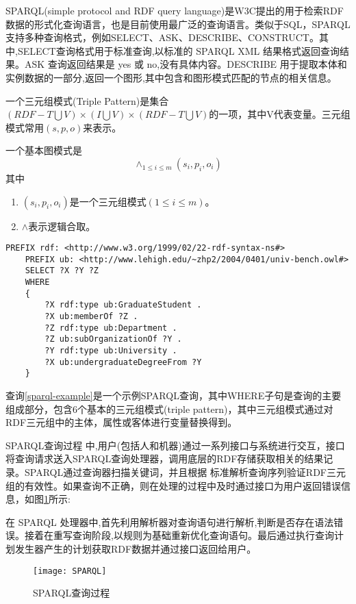 SPARQL(simple protocol and RDF query language)是W3C提出的用于检索RDF数据的形式化查询语言，也是目前使用最广泛的查询语言。类似于SQL，SPARQL支持多种查询格式，例如SELECT、ASK、DESCRIBE、CONSTRUCT。其中,SELECT查询格式用于标准查询,以标准的 SPARQL XML 结果格式返回查询结果。ASK 查询返回结果是 yes 或 no,没有具体内容。DESCRIBE 用于提取本体和实例数据的一部分,返回一个图形,其中包含和图形模式匹配的节点的相关信息。
\begin{definition}[（三元组模式）] 
    \label{Triple}   
    一个三元组模式(Triple Pattern)是集合$(RDF-T \bigcup V)\times(I \bigcup V)\times(RDF-T \bigcup V)$的一项，其中V代表变量。三元组模式常用$(s,p,o)$来表示。
\end{definition}
\begin{definition}    
    \label{BGP}
    一个基本图模式是$$\wedge_{1\leqslant i\leqslant m}(s_i,p_i,o_i)$$
    其中
    \begin{enumerate}
        \item $(s_i,p_i,o_i)$是一个三元组模式$(1 \leqslant  i \leqslant m)$。
        \item $\wedge$表示逻辑合取。
    \end{enumerate}
    
\end{definition}

\begin{lstlisting}[caption={SPARQL查询语句},label={sparql-example}]
    PREFIX rdf: <http://www.w3.org/1999/02/22-rdf-syntax-ns#>
    PREFIX ub: <http://www.lehigh.edu/~zhp2/2004/0401/univ-bench.owl#>
    SELECT ?X ?Y ?Z
    WHERE
    {
        ?X rdf:type ub:GraduateStudent .  
        ?X ub:memberOf ?Z .               
        ?Z rdf:type ub:Department .       
        ?Z ub:subOrganizationOf ?Y .      
        ?Y rdf:type ub:University .       
        ?X ub:undergraduateDegreeFrom ?Y  
    }
\end{lstlisting}
查询\ref{sparql-example}是一个示例SPARQL查询，其中WHERE子句是查询的主要组成部分，包含6个基本的三元组模式(triple pattern)，其中三元组模式通过对RDF三元组中的主体，属性或客体进行变量替换得到。

SPARQL查询过程 中,用户(包括人和机器)通过一系列接口与系统进行交互，接口将查询请求送入SPARQL查询处理器，调用底层的RDF存储获取相关的结果记录。SPARQL通过查询器扫描关键词，并且根据
标准解析查询序列验证RDF三元组的有效性。如果查询不正确，则在处理的过程中及时通过接口为用户返回错误信息，如图\ref{SPARQL查询过程}所示:

在 SPARQL 处理器中,首先利用解析器对查询语句进行解析,判断是否存在语法错误。接着在重写查询阶段,以规则为基础重新优化查询语句。最后通过执行查询计划发生器产生的计划获取RDF数据并通过接口返回给用户。
\begin{figure}[h]
\centering
\texttt{[image: SPARQL]}
\caption{SPARQL查询过程}
\label{SPARQL查询过程}
\end{figure}

